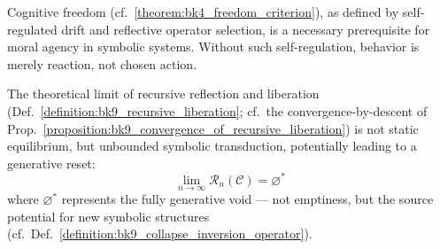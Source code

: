 \begin{corollary}
\label{corollary:bk9_emergence_of_moral_agency}
Cognitive freedom (cf.~\ref{theorem:bk4_freedom_criterion}), as defined by self-regulated drift and reflective operator selection, is a necessary prerequisite for moral agency in symbolic systems. Without such self-regulation, behavior is merely reaction, not chosen action.
\end{corollary}
\begin{corollary}
\label{corollary:bk9_final_collapse_inversion_principle}
The theoretical limit of recursive reflection and liberation (Def.~\ref{definition:bk9_recursive_liberation}; cf.~the convergence-by-descent of Prop.~\ref{proposition:bk9_convergence_of_recursive_liberation}) is not static equilibrium, but unbounded symbolic transduction, potentially leading to a generative reset:
\[
\lim_{n\to\infty} \mathcal{R}_n(\mathcal{C}) = \varnothing^*
\]
where $\varnothing^*$ represents the fully generative void — not emptiness, but the source potential for new symbolic structures (cf.~Def.~\ref{definition:bk9_collapse_inversion_operator}).
\end{corollary}
